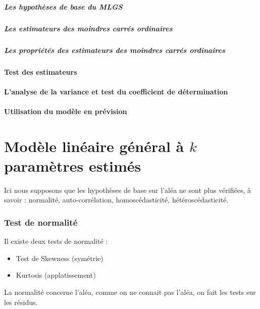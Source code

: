 \documentclass{article}
\begin{document}
\subsubsection{Les hypothèses de base du MLGS}
\subsubsection{Les estimateurs des moindres carrés ordinaires}
\subsubsection{Les propriétés des estimateurs des moindres carrés ordinaires}
\subsection{Test des estimateurs}
\subsection{L'analyse de la variance et test du coefficient de détermination}
\subsection{Utilisation du modèle en prévision}
\part{Modèle linéaire général à $k$ paramètres estimés}
Ici nous supposons que les hypothèses de base sur l'aléa ne sont plus vérifiées, à savoir : normalité, auto-corrélation, homoscédasticité, hétéroscédasticité.
\section{Test de normalité}
Il existe deux tests de normalité :
\begin{itemize}
	\item Test de Skewness (symétrie)
	\item Kurtosis (applatissement)
\end{itemize}
La normalité concerne l'aléa, comme on ne connait pas l'aléa, on fait les tests sur les résidus.
\end{document}
